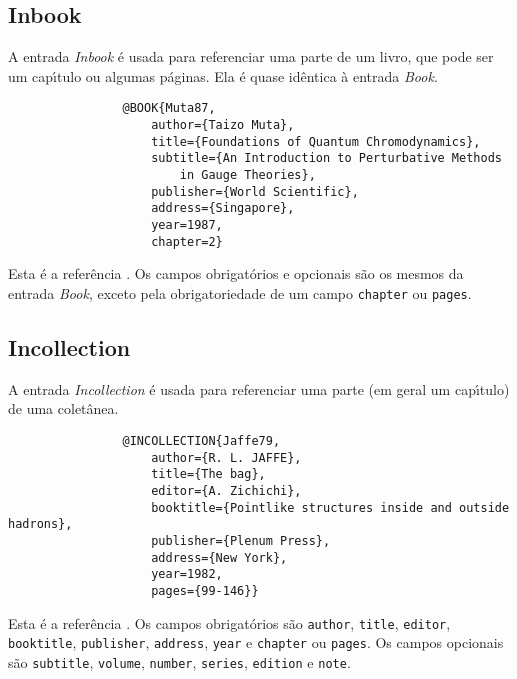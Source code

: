 \documentclass[a4paper,12pt]{article}
\newcommand{\ii}{\'{\i}}
\newcommand{\enf}{\em}
\begin{document}
			
			\begin{comment}
				\subsection*{Booklet}
				
				A entrada {\enf booklet} \'e usada para referenciar livros publicados
				sem aux{\ii}lio de editora.
				Sua forma geral \'e \cite{}
				\begin{verbatim}
				\end{verbatim}
				
				
				
				\subsection*{Conference}
				
				\'E o mesmo que a entrada {\enf Inproceedings}.
			\end{comment}
			
			
			
			\subsection*{Inbook}
			
			A entrada {\enf Inbook} \'e usada para referenciar uma parte de um livro,
			que pode ser um cap{\ii}tulo ou algumas p\'aginas. Ela \'e quase
			id\^entica \`a entrada {\enf Book}.
			\begin{verbatim}
				@BOOK{Muta87,
					author={Taizo Muta},
					title={Foundations of Quantum Chromodynamics},
					subtitle={An Introduction to Perturbative Methods
						in Gauge Theories},
					publisher={World Scientific},
					address={Singapore},
					year=1987,
					chapter=2}
			\end{verbatim}
			Esta \'e a refer\^encia \cite{Muta87in}.
			Os campos obrigat\'orios e opcionais s\~ao os mesmos da entrada
			{\enf Book}, exceto pela obrigatoriedade de um campo
			\verb+chapter+ ou \verb+pages+.
			
			
			
			\subsection*{Incollection}
			
			A entrada {\enf Incollection} \'e usada para referenciar 
			uma parte (em geral um cap{\ii}tulo) de uma colet\^anea.
			\begin{verbatim}
				@INCOLLECTION{Jaffe79,
					author={R. L. JAFFE},
					title={The bag},
					editor={A. Zichichi},
					booktitle={Pointlike structures inside and outside hadrons},
					publisher={Plenum Press},
					address={New York},
					year=1982,
					pages={99-146}}
			\end{verbatim}
			Esta \'e a refer\^encia \cite{Jaffe79}.
			Os campos obrigat\'orios s\~ao \verb+author+, \verb+title+, \verb+editor+,
			\verb+booktitle+, \verb+publisher+, \verb+address+, \verb+year+ e
			\verb+chapter+ ou \verb+pages+.
			Os campos opcionais s\~ao \verb+subtitle+, \verb+volume+, \verb+number+,
			\verb+series+, \verb+edition+ e \verb+note+.
			
\end{document}
